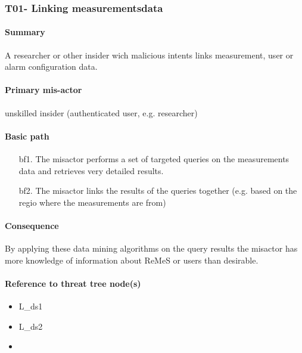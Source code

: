 \subsubsection{T01- Linking measurementsdata}

\paragraph{Summary}

\npar A researcher or other insider wich malicious intents links measurement,
user or alarm configuration data.

\paragraph{Primary mis-actor}

\npar unskilled insider (authenticated user, e.g. researcher)

\paragraph{Basic path}
\begin{enumerate}
	\item[bf1.] The misactor performs a set of targeted queries on the
	measurements data and retrieves very detailed results.
    \item[bf2.] The misactor links the results of the queries together (e.g.
    based on the regio where the measurements are from)
\end{enumerate}

\paragraph{Consequence}

\npar By applying these data mining algorithms on the query results the misactor
has more knowledge of information about ReMeS or users than desirable. 

\paragraph{Reference to threat tree node(s)} 

\begin{itemize}
  \item L\_ds1
  \item L\_ds2
  \item 
\end{itemize}

